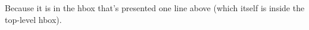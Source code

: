 Because it is in the hbox that's presented one line above (which itself is inside the top-level hbox).
